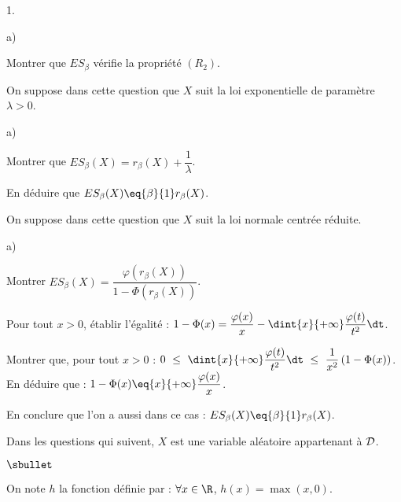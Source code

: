 \documentclass[11pt]{article}%
\begin{document}
\begin{noliste}{1.}
\begin{noliste}{a)}
    
    \item Montrer que $ES_\beta$ vérifie la propriété $(R_2)$.
    
    
  \end{noliste}
  
  \item On suppose dans cette question que $X$ suit la loi 
  exponentielle de paramètre $\lambda>0$.
  \begin{noliste}{a)}
    \setlength{\itemsep}{2mm}
    \item Montrer que $ES_\beta(X)=r_\beta(X)+\dfrac{1}{\lambda}$.
    
    

    
    \item En déduire que $ES_\beta(X) \eq{\beta}{1} r_\beta(X)$.
    
    
  \end{noliste}
  
  
  
  
  
  
  \item On suppose dans cette question que $X$ suit la loi normale 
  centrée réduite.
  \begin{noliste}{a)}
    \setlength{\itemsep}{2mm}
    \item Montrer $ES_\beta(X) = 
    \dfrac{\varphi(r_\beta(X))}{1-\Phi(r_\beta(X))}$.
    
    
    
    \item Pour tout $x >0$, établir l'égalité : $1-\Phi(x)=
    \dfrac{\varphi(x)}{x}-\dint{x}{+\infty} \dfrac{\varphi(t)}{t^2} 
    \dt$.
    
    

    \item Montrer que, pour tout $x>0$ : $0 \ \leq \ \dint{x}{+\infty}  
    \dfrac{\varphi(t)}{t^2} \dt \ \leq \ \dfrac{1}{x^2}\, 
    (1-\Phi(x))$.\\
    En déduire que : $1-\Phi(x) \eq{x}{+\infty} 
    \dfrac{\varphi(x)}{x}$.
    
    

    
    \item En conclure que l'on a aussi dans ce cas : $ES_\beta(X) 
    \eq{\beta}{1} r_\beta(X)$.
    
    
  \end{noliste}
  Dans les questions qui suivent, $X$ est une variable aléatoire 
  appartenant à ${\cal D}$.
  \begin{noliste}{$\sbullet$}
    \item On note $h$ la fonction définie par : $\forall x 
    \in \R$, $h(x)=\max(x,0)$.
    

\end{noliste}
\end{noliste}
\end{document}
